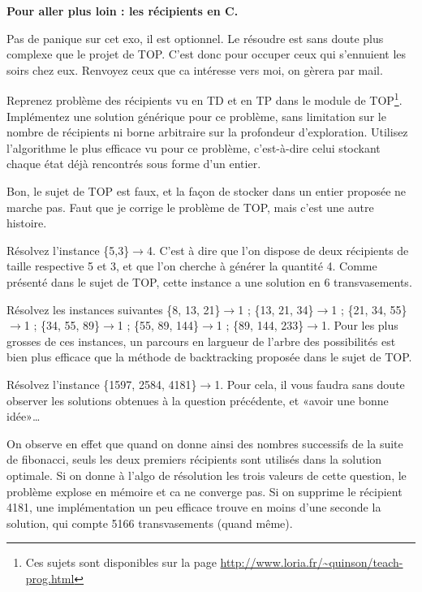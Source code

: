 \documentclass[10pt]{article}\usepackage[correction,nu]{esial}
\begin{document}
\Exercice\textbf{Pour aller plus loin : les récipients en C.} 

\begin{Reponse}
  Pas de panique sur cet exo, il est optionnel. Le résoudre est sans doute plus
  complexe que le projet de TOP. C'est donc pour occuper ceux qui s'ennuient
  les soirs chez eux. Renvoyez ceux que ca intéresse vers moi, on gèrera par
  mail.
\end{Reponse}

Reprenez problème des récipients vu en TD et en TP dans le module de
TOP\footnote{Ces sujets sont disponibles sur la page
  \url{http://www.loria.fr/~quinson/teach-prog.html}}. Implémentez une solution
générique pour ce problème, sans limitation sur le nombre de récipients ni
borne arbitraire sur la profondeur d'exploration.  Utilisez l'algorithme le
plus efficace vu pour ce problème, c'est-à-dire celui stockant chaque état déjà
rencontrés sous forme d'un entier.

\begin{Reponse}
  Bon, le sujet de TOP est faux, et la façon de stocker dans un entier proposée
  ne marche pas. Faut que je corrige le problème de TOP, mais c'est une autre histoire.
\end{Reponse}

\Question Résolvez l'instance \{5,3\}$\rightarrow$4. C'est à dire que l'on dispose
de deux récipients de taille respective 5 et 3, et que l'on cherche à générer
la quantité 4. Comme présenté dans le sujet de TOP, cette instance a une
solution en 6 transvasements.

\Question Résolvez les instances suivantes 
\{8, 13, 21\}$\rightarrow$1 ; 
\{13, 21, 34\}$\rightarrow$1 ; 
\{21, 34, 55\}$\rightarrow$1 ; 
\{34, 55, 89\}$\rightarrow$1 ;
\{55, 89, 144\}$\rightarrow$1 ;
\{89, 144, 233\}$\rightarrow$1.
Pour les plus grosses de ces instances, un parcours en largueur de l'arbre des
possibilités est bien plus efficace que la méthode de backtracking proposée
dans le sujet de TOP.

\Question Résolvez l'instance \{1597, 2584, 4181\}$\rightarrow$1.
Pour cela, il vous faudra sans doute observer les solutions obtenues à la
question précédente, et «avoir une bonne idée»\ldots

\begin{Reponse}
  On observe en effet que quand on donne ainsi des nombres successifs de la
  suite de fibonacci, seuls les deux premiers récipients sont utilisés dans la
  solution optimale. Si on donne à l'algo de résolution les trois valeurs de
  cette question, le problème explose en mémoire et ca ne converge pas. Si on
  supprime le récipient 4181, une implémentation un peu efficace trouve en
  moins d'une seconde la solution, qui compte 5166 transvasements (quand même).
\end{Reponse}
\end{document}
